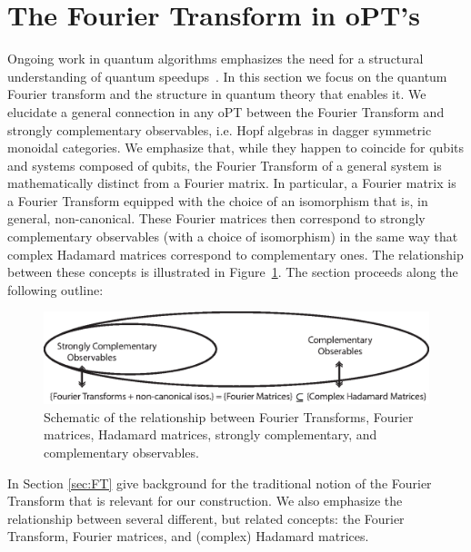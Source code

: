 \section{The Fourier Transform in oPT's}
\label{sec:strcomplFT}

Ongoing work in quantum algorithms emphasizes the need for a structural understanding of quantum speedups~\cite{aaronson2014need}. In this section we focus on the quantum Fourier transform and the structure in quantum theory that enables it. We elucidate a general connection in any oPT between the Fourier Transform and strongly complementary observables, i.e. Hopf algebras in dagger symmetric monoidal categories. We emphasize that, while they happen to coincide for qubits and systems composed of qubits, the Fourier Transform of a general system is mathematically distinct from a Fourier matrix.  In particular, a Fourier matrix is a Fourier Transform equipped with the choice of an isomorphism that is, in general, non-canonical. These Fourier matrices then correspond to strongly complementary observables (with a choice of isomorphism) in the same way that complex Hadamard matrices correspond to complementary ones. The relationship between these concepts is illustrated in Figure~\ref{fig:FTtoHrelationship}. The section proceeds along the following outline:

\begin{figure}
\includegraphics[width=\linewidth]{images/ftschematic.eps}
\caption[Schematic of the relationship between Fourier Transforms, Fourier matrices, Hadamard matrices, strongly complementary, and complementary observables.]{Schematic of the relationship between Fourier Transforms, Fourier matrices, Hadamard matrices, strongly complementary, and complementary observables.}
\label{fig:FTtoHrelationship}
\end{figure}

In Section \ref{sec:FT} give background for the traditional notion of the Fourier Transform that is relevant for our construction.  We also emphasize the relationship between several different, but related concepts: the Fourier Transform, Fourier matrices, and (complex) Hadamard matrices.

